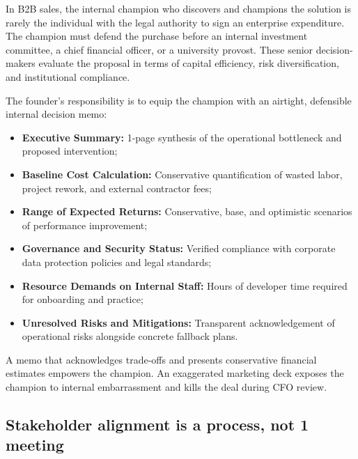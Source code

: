 In B2B sales, the internal champion who discovers and champions the solution is rarely the individual with the legal authority to sign an enterprise expenditure. The champion must defend the purchase before an internal investment committee, a chief financial officer, or a university provost. These senior decision-makers evaluate the proposal in terms of capital efficiency, risk diversification, and institutional compliance.

The founder's responsibility is to equip the champion with an airtight, defensible internal decision memo:
\begin{itemize}
\item \textbf{Executive Summary:} 1-page synthesis of the operational bottleneck and proposed intervention;
\item \textbf{Baseline Cost Calculation:} Conservative quantification of wasted labor, project rework, and external contractor fees;
\item \textbf{Range of Expected Returns:} Conservative, base, and optimistic scenarios of performance improvement;
\item \textbf{Governance and Security Status:} Verified compliance with corporate data protection policies and legal standards;
\item \textbf{Resource Demands on Internal Staff:} Hours of developer time required for onboarding and practice;
\item \textbf{Unresolved Risks and Mitigations:} Transparent acknowledgement of operational risks alongside concrete fallback plans.
\end{itemize}
A memo that acknowledges trade-offs and presents conservative financial estimates empowers the champion. An exaggerated marketing deck exposes the champion to internal embarrassment and kills the deal during CFO review.

\subsection{Stakeholder alignment is a process, not 1 meeting}

